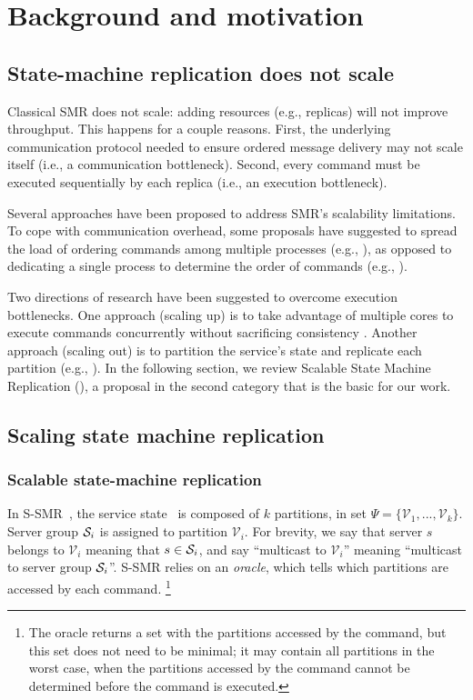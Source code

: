 \chapter[Background and motivation]{Background and motivation}

\section{State-machine replication does not scale}
\label{sec:smr-does-not-scale}

Classical SMR does not scale: adding resources (e.g., replicas) will
not improve throughput. This happens for a couple reasons. First, the underlying
communication protocol needed to ensure ordered message delivery may not scale
itself (i.e., a communication bottleneck). Second, every command must be
executed sequentially by each replica (i.e., an execution bottleneck).

Several approaches have been proposed to address SMR's scalability limitations.
To cope with communication overhead, some proposals have suggested to spread the
load of ordering commands among multiple processes (e.g.,
\cite{Moraru:2013gw,Mencius,Marandi:2012hb}), as opposed to dedicating a single
process to determine the order of commands (e.g.,
\cite{Lamport:1998ea}).%

Two directions of research have been suggested to overcome execution
bottlenecks. One approach (scaling up) is to take advantage of multiple cores to
execute commands concurrently without sacrificing consistency
\cite{Kapritsos:2012um,Marandi:2014bj,Kotla:2004ep,Guo:2014jp}. Another approach
(scaling out) is to partition the service's state and replicate each partition
(e.g., \cite{Glendenning:2011kj,Marandi:2011dj}). In the following section, we
review Scalable State Machine Replication (\ssmr), a proposal in the second
category that is the basic for our work.

\section{Scaling state machine replication}

\subsection{Scalable state-machine replication}

\label{sec:ssmr}

In S-SMR~\cite{bezerra2014ssmr}, the service state \vvt\ is composed of $k$
partitions, in set $\Psi = \{\mathcal{V}_1, ..., \mathcal{V}_k\}$. Server group
$\mathcal{S}_i$ is assigned to partition $\mathcal{V}_i$. For brevity, we say that
server $s$ belongs to $\mathcal{V}_i$ meaning that $s \in \mathcal{S}_i$, and say
``multicast to $\mathcal{V}_i$'' meaning ``multicast to server group $\mathcal{S}_i$''.
S-SMR relies on an \emph{oracle}, which tells which partitions are accessed by
each command.%
\footnote{The oracle returns a set with the partitions accessed by the command,
but this set does not need to be minimal; it may contain all partitions in the
worst case, when the partitions accessed by the command cannot be determined
before the command is executed.}

